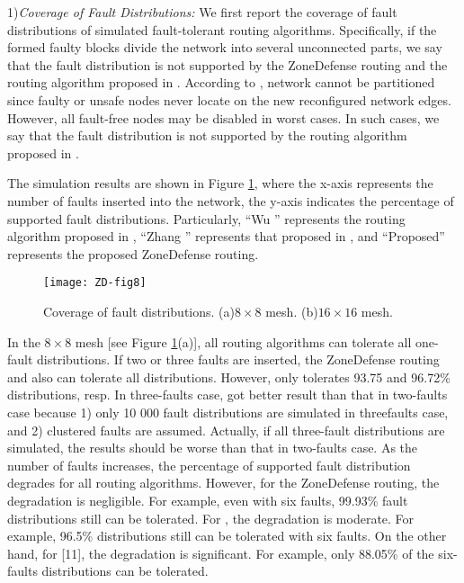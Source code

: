 1)\textit{Coverage of Fault Distributions:} We first report the coverage of fault distributions of simulated fault-tolerant routing algorithms. Specifically, if the formed faulty blocks divide the network into several unconnected parts, we say that the fault distribution is not supported by the ZoneDefense routing and the routing algorithm proposed in \cite{zhang2008reconfigurable}. According to \cite{wu2003fault}, network cannot be partitioned since faulty or unsafe nodes never locate on the new reconfigured network edges. However, all fault-free nodes may be disabled in worst cases. In such cases, we say that the fault distribution is not supported by the routing algorithm proposed in \cite{wu2003fault}.

The simulation results are shown in Figure \ref{fig:ZD-fig8}, where the x-axis represents the number of faults inserted into the network, the y-axis indicates the percentage of supported fault distributions. Particularly, “Wu \cite{wu2003fault}” represents the routing algorithm proposed in \cite{wu2003fault}, “Zhang \cite{zhang2008reconfigurable}” represents that proposed in \cite{zhang2008reconfigurable}, and “Proposed” represents the proposed ZoneDefense routing.

\begin{figure}[h]
    \centering
        \texttt{[image: ZD-fig8]}
          \caption{Coverage of fault distributions. (a)$8 \times 8$ mesh. (b)$16 \times 16$ mesh.}
        \label{fig:ZD-fig8}
\end{figure}

In the $8 \times 8$ mesh [see Figure \ref{fig:ZD-fig8}(a)], all routing algorithms can tolerate all one-fault distributions. If two or three faults are inserted, the ZoneDefense routing and \cite{wu2003fault} also can tolerate all distributions. However, \cite{zhang2008reconfigurable} only tolerates 93.75 and 96.72\% distributions, resp. In three-faults case,  \cite{zhang2008reconfigurable} got better result than that in two-faults case because 1) only 10 000 fault distributions are simulated in threefaults case, and 2) clustered faults are assumed. Actually, if all three-fault distributions are simulated, the results should be worse than that in two-faults case. As the number of faults increases, the percentage of supported fault distribution degrades for all routing algorithms. However, for the ZoneDefense routing, the degradation is negligible. For example, even with six faults, 99.93\% fault distributions still can be tolerated. For \cite{wu2003fault}, the degradation is moderate. For example, 96.5\% distributions still can be tolerated with six faults. On the other hand, for \cite{zhang2008reconfigurable}[11], the degradation is significant. For example, only 88.05\% of the six-faults distributions can be tolerated.

